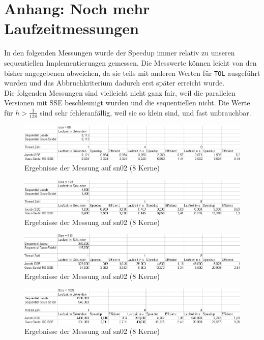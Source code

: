 \documentclass{article}
\begin{document}
\newpage

\section{Anhang: Noch mehr Laufzeitmessungen}
In den folgenden Messungen wurde der Speedup immer relativ zu unseren sequentiellen Implementierungen gemessen. Die Messwerte können leicht von den bisher angegebenen abweichen, da sie teils mit anderen Werten für \texttt{TOL} ausgeführt wurden und das Abbruchkriterium dadurch erst später erreicht wurde. %
\\
Die folgenden Messungen sind vielleicht nicht ganz fair, weil die parallelen Versionen mit SSE beschleunigt wurden und die sequentiellen nicht. Die Werte für $h > \frac{1}{128}$ sind sehr fehleranfällig, weil sie so klein sind, und fast unbrauchbar. \label{ergebnisse}
\begin{figure}[h] 
  \centering
     \includegraphics[width=1.0\textwidth]{bilder/sn265.png}
  \caption{Ergebnisse der Messung auf sn02 (8 Kerne)}
\end{figure}
\begin{figure}[h] 
  \centering
     \includegraphics[width=1.0\textwidth]{bilder/sn2129.png}
  \caption{Ergebnisse der Messung auf sn02 (8 Kerne)}
\end{figure}
\begin{figure}[h] 
  \centering
     \includegraphics[width=1.0\textwidth]{bilder/sn2513.png}
  \caption{Ergebnisse der Messung auf sn02 (8 Kerne)}
\end{figure}
\begin{figure}[h] 
  \centering
     \includegraphics[width=1.0\textwidth]{bilder/sn21025.png}
  \caption{Ergebnisse der Messung auf sn02 (8 Kerne)}
\end{figure}
\end{document}
